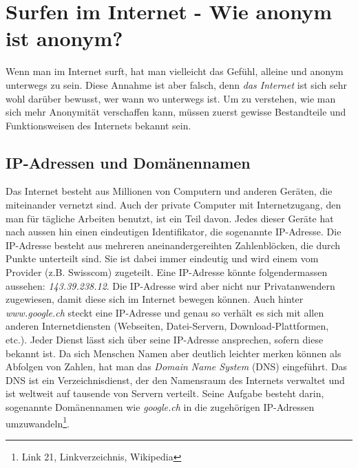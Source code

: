 \section{Surfen im Internet - Wie anonym ist anonym?}
Wenn man im Internet surft, hat man vielleicht das Gefühl, alleine und anonym unterwegs zu sein.
Diese Annahme ist aber falsch, denn \textit{das Internet} ist sich sehr wohl darüber bewusst, wer wann wo unterwegs ist. Um zu verstehen, wie man sich  mehr Anonymität verschaffen kann, müssen zuerst gewisse Bestandteile und Funktionsweisen des Internets bekannt sein.

\subsection{IP-Adressen und Domänennamen}
Das Internet besteht aus Millionen von Computern und anderen Geräten, die miteinander vernetzt sind.
Auch der private Computer mit Internetzugang, den man für tägliche Arbeiten benutzt, ist ein Teil davon.
Jedes dieser Geräte hat nach aussen hin einen eindeutigen Identifikator, die sogenannte IP-Adresse.
Die IP-Adresse besteht aus mehreren aneinandergereihten Zahlenblöcken, die durch Punkte unterteilt sind.
Sie ist dabei immer eindeutig und wird einem vom Provider (z.B. Swisscom) zugeteilt.
Eine IP-Adresse könnte folgendermassen aussehen: \textit{143.39.238.12}.
Die IP-Adresse wird aber nicht nur Privatanwendern zugewiesen, damit diese sich im Internet bewegen können.
Auch hinter \textit{www.google.ch} steckt eine IP-Adresse und genau so verhält es sich mit allen anderen Internetdiensten (Webseiten, Datei-Servern, Download-Plattformen, etc.).
Jeder Dienst lässt sich über seine IP-Adresse ansprechen, sofern diese bekannt ist.
Da sich Menschen Namen aber deutlich leichter merken können als Abfolgen von Zahlen, hat man das \textit{Domain Name System} (DNS) eingeführt.
Das DNS ist ein Verzeichnisdienst, der den Namensraum des Internets verwaltet und ist weltweit auf tausende von Servern verteilt.
Seine Aufgabe besteht darin, sogenannte Domänennamen wie \textit{google.ch} in die zugehörigen IP-Adressen umzuwandeln\footnote{Link 21, Linkverzeichnis, Wikipedia}.

